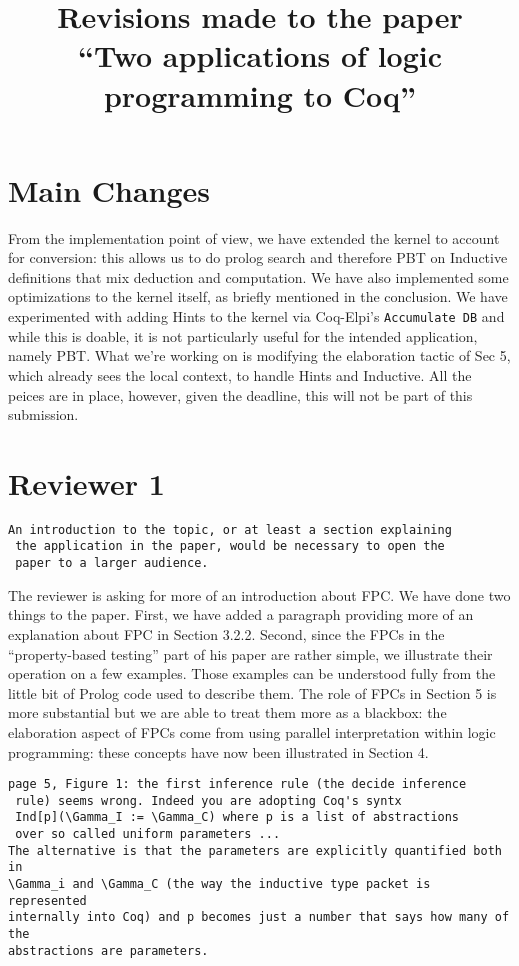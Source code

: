 \documentclass{article}
\begin{document}
\title{Revisions made to the paper \\
  ``Two applications of logic programming to Coq''}
\maketitle{}

\section*{Main Changes}

From the implementation point of view, we have extended the kernel to
account for conversion: this allows us to do prolog search and
therefore PBT on Inductive definitions that mix deduction and
computation. We have also implemented some optimizations to the kernel
itself, as briefly mentioned in the conclusion. We have experimented
with adding Hints to the kernel via Coq-Elpi's \texttt{Accumulate DB}
and while this is doable, it is not particularly useful for the
intended application, namely PBT. What we're working on is modifying
the elaboration tactic of Sec 5, which already sees the local context,
to handle Hints and Inductive. All the peices are in place, however,  given the deadline, this
will not be part of this submission.

\section*{Reviewer 1}
\begin{verbatim}
An introduction to the topic, or at least a section explaining
 the application in the paper, would be necessary to open the
 paper to a larger audience.
\end{verbatim}

The reviewer is asking for more of an introduction about FPC.  We
have done two things to the paper.  First, we have added a
paragraph providing more of an explanation about FPC in Section
3.2.2.  Second, since the FPCs in the ``property-based testing''
part of his paper are rather simple, we illustrate their
operation on a few examples.  Those examples can be understood
fully from the little bit of Prolog code used to describe them.
The role of FPCs in Section 5 is more substantial but we are able
to treat them more as a blackbox: the elaboration aspect of FPCs
come from using parallel interpretation within logic programming:
these concepts have now been illustrated in Section 4.

\begin{verbatim}
page 5, Figure 1: the first inference rule (the decide inference
 rule) seems wrong. Indeed you are adopting Coq's syntx
 Ind[p](\Gamma_I := \Gamma_C) where p is a list of abstractions
 over so called uniform parameters ...
The alternative is that the parameters are explicitly quantified both in
\Gamma_i and \Gamma_C (the way the inductive type packet is represented
internally into Coq) and p becomes just a number that says how many of the
abstractions are parameters.
\end{verbatim}
\end{document}
